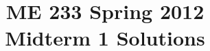 \documentclass[letterpaper,10pt]{article}
\begin{document}
\thispagestyle{empty}

\title{\bf ME 233 Spring 2012 \\ Midterm 1 Solutions}
\date{}
\maketitle






\end{document}
